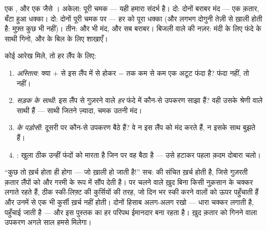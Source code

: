\begin{example}\label{ex:g7:circuits-series-parallel:brightness}
एक , और एक जैसे । अकेला: पूरी चमक --- यही हमारा संदर्भ है।
 दो: दोनों बराबर मंद --- एक क़तार, बँटा हुआ धक्का। 
दो: दोनों पूरी चमक पर --- हर  को पूरा धक्का (और  लगभग दोगुनी
तेज़ी से ख़ाली होती है: मुफ़्त कुछ भी नहीं)।  तीन: और भी मंद,
और सब बराबर। बिजली वाले की नज़र: मंदी के लिए फंदे के साथी गिनो, और
 के बिल के लिए शाखाएँ।
\end{example}

\begin{method}[किसी भी लैंप का भविष्य बताना]\label{met:g7:circuits-series-parallel:predict}
कोई आरेख मिले, तो हर लैंप के लिए:
\begin{enumerate}
  \item \emph{अस्तित्व}: क्या $+$ से इस लैंप में से होकर $-$ तक कम
        से कम एक अटूट फंदा है? फंदा नहीं, तो  नहीं।
  \item \emph{सड़क के साथी}: इस लैंप से गुज़रने वाले \emph{हर} फंदे
        में कौन-से उपकरण साझा हैं? वही उसके श्रेणी वाले साथी हैं ---
        साथी जितने ज़्यादा, चमक उतनी मंद।
  \item \emph{ के पड़ोसी}: दूसरी  पर कौन-से उपकरण बैठे हैं?
        वे न इस लैंप को मंद करते हैं, न इसके साथ बुझते हैं।
  \item \emph{}: खुला  ठीक उन्हीं फंदों को मारता है जिन पर
        वह बैठा है --- उसे हटाकर पहला क़दम दोबारा चलो।
\end{enumerate}
\end{method}

\begin{remark}\label{rem:g7:circuits-series-parallel:whyhard}
``कुछ तो ख़र्च होता ही होगा ---  जो ख़ाली हो जाती है!'' सच: 
की संचित \emph{} ख़र्च होती है, जिसे गुज़रती क़तार लैंपों को
 और गरमी के रूप में सौंप देती है। पर चलने वाले ख़ुद बिना किसी
नुक़सान के चक्कर लगाते रहते हैं, ठीक स्की-लिफ़्ट की कुर्सियों की तरह,
जो दिन भर स्की करने वालों को ऊपर पहुँचाती हैं और उनमें से एक भी कुर्सी
ख़र्च नहीं होती। दोनों हिसाब अलग-अलग रखो --- धारा चक्कर लगाती है,
 पहुँचाई जाती है --- और इस पुस्तक का हर परिपथ ईमानदार बना रहता
है। ख़ुद क़तार को गिनने वाला उपकरण अगले साल हमसे मिलेगा।
\end{remark}

